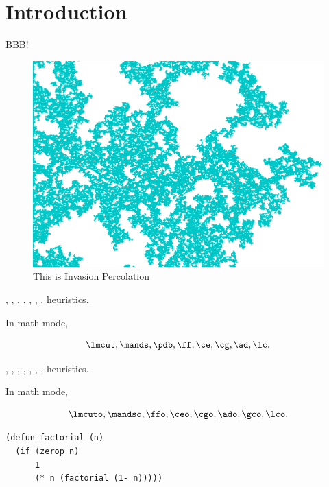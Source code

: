 \section{Introduction}

BBB!  \cite{Asai2016}

\begin{figure}[tb]
 \includegraphics{img/static/ip.png}
 \caption{This is Invasion Percolation}
 \label{fig:ip}
\end{figure}

\lmcut, \mands, \pdb, \ff, \ce, \cg, \ad, \lc heuristics.

In math mode,

\[
 \lmcut, \mands, \pdb, \ff, \ce, \cg, \ad, \lc.
\]

\lmcuto, \mandso, \ffo, \ceo, \cgo, \ado, \gco, \lco heuristics.

In math mode,

\[
 \lmcuto, \mandso, \ffo, \ceo, \cgo, \ado, \gco, \lco.
\]

\begin{verbatim}
(defun factorial (n)
  (if (zerop n)
      1
      (* n (factorial (1- n)))))
\end{verbatim}

